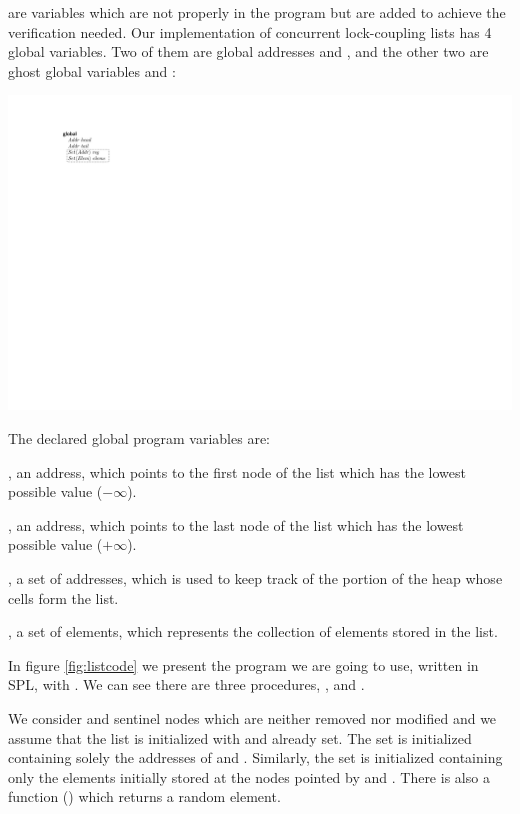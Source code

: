  are variables which are not properly in the program but are added to 
achieve the verification needed.
Our implementation of concurrent lock-coupling lists has 4 global variables.
%
Two of them are global addresses \head and \tail, and the other two are ghost global variables \region and \elements:
%
\begin{center}
	\includegraphics[scale=\figscale]{graphics/_lists_classes}
\end{center}
%
The declared global program variables are:

\head, an address, which points to the first node of the list which has the lowest possible value ($-\infty$).

\tail, an address, which points to the last node of the list  which has the lowest possible value ($+\infty$).

\region, a set of addresses, which is used to keep track of the portion of the heap whose cells form the list.

\elements, a set of elements, which represents the collection of elements stored in the list.

In figure \ref{fig:listcode} we present the program we are going to use, written in \gls{SPL}, with . We can see there are three procedures, \Search, \Insert and \Remove. 

We consider \head and \tail sentinel nodes which are neither removed nor 
modified and we assume that the list is initialized with \head and \tail 
already set.
%
The set \region is initialized containing solely the addresses of \head 
and \tail.
%
Similarly, the set \elements is initialized containing only the elements 
initially stored at the nodes pointed by \head and \tail.
%
There is also a function () which returns a random element. 


